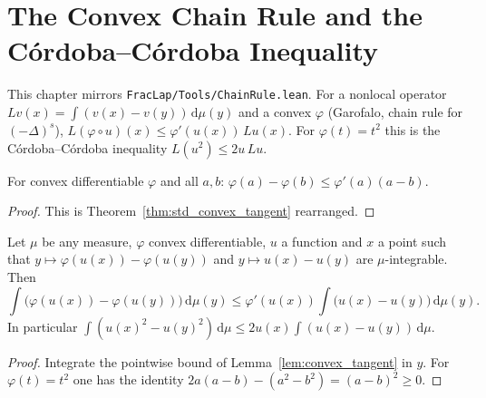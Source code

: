 \chapter{The Convex Chain Rule and the Córdoba--Córdoba Inequality}

This chapter mirrors \texttt{FracLap/Tools/ChainRule.lean}. For a nonlocal operator $L v(x) = \int (v(x) - v(y))\, \mathrm{d}\mu(y)$ and a convex $\varphi$ (Garofalo, chain rule for $(-\Delta)^s$), $L(\varphi \circ u)(x) \le \varphi'(u(x))\, L u(x)$. For $\varphi(t) = t^2$ this is the Córdoba--Córdoba inequality $L(u^2) \le 2 u\, L u$.

\begin{lemma}\label{lem:convex_tangent}
\leanok
For convex differentiable $\varphi$ and all $a, b$: $\varphi(a) - \varphi(b) \le \varphi'(a)(a - b)$.
\end{lemma}

\begin{proof}
\leanok
This is Theorem~\ref{thm:std_convex_tangent} rearranged.
\end{proof}

\begin{theorem}\label{thm:chain_rule}
\leanok
Let $\mu$ be any measure, $\varphi$ convex differentiable, $u$ a function and $x$ a point such that $y \mapsto \varphi(u(x)) - \varphi(u(y))$ and $y \mapsto u(x) - u(y)$ are $\mu$-integrable. Then
\[
  \int \bigl(\varphi(u(x)) - \varphi(u(y))\bigr)\, \mathrm{d}\mu(y) \le \varphi'(u(x)) \int \bigl(u(x) - u(y)\bigr)\, \mathrm{d}\mu(y).
\]
In particular $\int (u(x)^2 - u(y)^2)\, \mathrm{d}\mu \le 2 u(x) \int (u(x) - u(y))\, \mathrm{d}\mu$.
\end{theorem}

\begin{proof}
\leanok
Integrate the pointwise bound of Lemma~\ref{lem:convex_tangent} in $y$. For $\varphi(t) = t^2$ one has the identity $2a(a - b) - (a^2 - b^2) = (a - b)^2 \ge 0$.
\end{proof}
